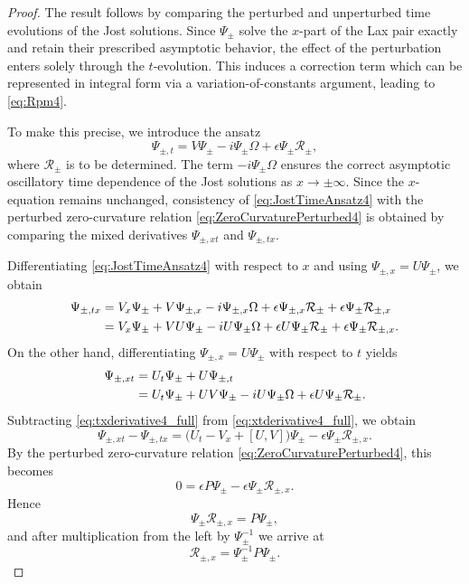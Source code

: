 \documentclass[11pt]{amsart}
\theoremstyle{definition}
\numberwithin{equation}{section}
\begin{document}
\begin{proof}
The result follows by comparing the perturbed and unperturbed time evolutions of the Jost solutions. 
Since $\Psi_\pm$ solve the $x$-part of the Lax pair exactly and retain their prescribed asymptotic behavior, the effect of the perturbation enters solely through the $t$-evolution. 
This induces a correction term which can be represented in integral form via a variation-of-constants argument, leading to \eqref{eq:Rpm4}.

To make this precise, we introduce the ansatz
\begin{equation}
\Psi_{\pm,t}=V\Psi_\pm - i\Psi_\pm \Omega + \epsilon \Psi_\pm \mathcal{R}_\pm,
\label{eq:JostTimeAnsatz4}
\end{equation}
where $\mathcal{R}_\pm$ is to be determined. The term $-i\Psi_\pm\Omega$ ensures the correct asymptotic oscillatory time dependence of the Jost solutions as $x\to\pm\infty$. 
Since the $x$-equation remains unchanged, consistency of \eqref{eq:JostTimeAnsatz4} with the perturbed zero-curvature relation \eqref{eq:ZeroCurvaturePerturbed4} is obtained by comparing the mixed derivatives $\Psi_{\pm,xt}$ and $\Psi_{\pm,tx}$.

Differentiating \eqref{eq:JostTimeAnsatz4} with respect to $x$ and using $\Psi_{\pm,x}=U\Psi_\pm$, we obtain
\begin{align}
\Psi_{\pm,tx}
&=V_x\Psi_\pm + V\Psi_{\pm,x} - i\Psi_{\pm,x}\Omega + \epsilon \Psi_{\pm,x}\mathcal{R}_\pm + \epsilon \Psi_\pm \mathcal{R}_{\pm,x} \notag\\
&=V_x\Psi_\pm + VU\Psi_\pm - iU\Psi_\pm\Omega + \epsilon U\Psi_\pm \mathcal{R}_\pm + \epsilon \Psi_\pm \mathcal{R}_{\pm,x}.
\label{eq:txderivative4_full}
\end{align}
On the other hand, differentiating $\Psi_{\pm,x}=U\Psi_\pm$ with respect to $t$ yields
\begin{align}
\Psi_{\pm,xt}
&=U_t\Psi_\pm + U\Psi_{\pm,t} \notag\\
&=U_t\Psi_\pm + UV\Psi_\pm - iU\Psi_\pm\Omega + \epsilon U\Psi_\pm \mathcal{R}_\pm.
\label{eq:xtderivative4_full}
\end{align}
Subtracting \eqref{eq:txderivative4_full} from \eqref{eq:xtderivative4_full}, we obtain
\begin{equation}
\Psi_{\pm,xt}-\Psi_{\pm,tx}
=
\bigl(U_t - V_x + [U,V]\bigr)\Psi_\pm - \epsilon \Psi_\pm \mathcal{R}_{\pm,x}.
\label{eq:mixeddifference4}
\end{equation}
By the perturbed zero-curvature relation \eqref{eq:ZeroCurvaturePerturbed4}, this becomes
\[
0=\epsilon P\Psi_\pm - \epsilon \Psi_\pm \mathcal{R}_{\pm,x}.
\]
Hence
\begin{equation}
\Psi_\pm \mathcal{R}_{\pm,x}=P\Psi_\pm,
\end{equation}
and after multiplication from the left by $\Psi_\pm^{-1}$ we arrive at
\begin{equation}
\mathcal{R}_{\pm,x} = \Psi_\pm^{-1}P\Psi_\pm.
\label{eq:Rpmx4}
\end{equation}


\end{proof}
\end{document}
